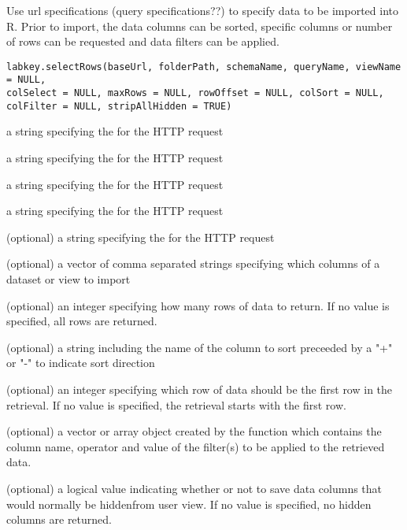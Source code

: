 \begin{Description}\relax
Use url specifications (query specifications??) to specify data to be imported into R. Prior to import, 
the data columns can be sorted, specific columns or number of rows can be requested and
data filters can be applied.
\end{Description}
\begin{Usage}
\begin{verbatim}
labkey.selectRows(baseUrl, folderPath, schemaName, queryName, viewName = NULL, 
colSelect = NULL, maxRows = NULL, rowOffset = NULL, colSort = NULL, 
colFilter = NULL, stripAllHidden = TRUE)
\end{verbatim}
\end{Usage}
\begin{Arguments}
\begin{ldescription}
\item[\code{baseUrl}] a string specifying the for the HTTP request
\item[\code{folderPath}] a string specifying the  for the HTTP request
\item[\code{schemaName}] a string specifying the   for the HTTP request
\item[\code{queryName}] a string specifying the  for the HTTP request
\item[\code{viewName}] (optional) a string specifying the  for the HTTP request
\item[\code{colSelect}] (optional) a vector of comma separated strings specifying which columns of a dataset or view to import
\item[\code{maxRows}] (optional) an integer specifying how many rows of data to return. If no value is specified, all rows are returned.
\item[\code{colSort}] (optional) a string including the name of the column to sort preceeded by a "+" or "-" to indicate sort direction
\item[\code{rowOffset}] (optional) an integer specifying which row of data should be the first row in the retrieval. If no
value is specified, the retrieval starts with the first row.
\item[\code{colFilter}] (optional) a vector or array object created by the  function which contains the
column name, operator and value of the filter(s) to be applied to the retrieved data.
\item[\code{stripAllHidden}] (optional) a logical value indicating whether or not to save data columns that would normally be hiddenfrom user view. If no value is specified, no hidden columns are returned.
\end{ldescription}
\end{Arguments}
